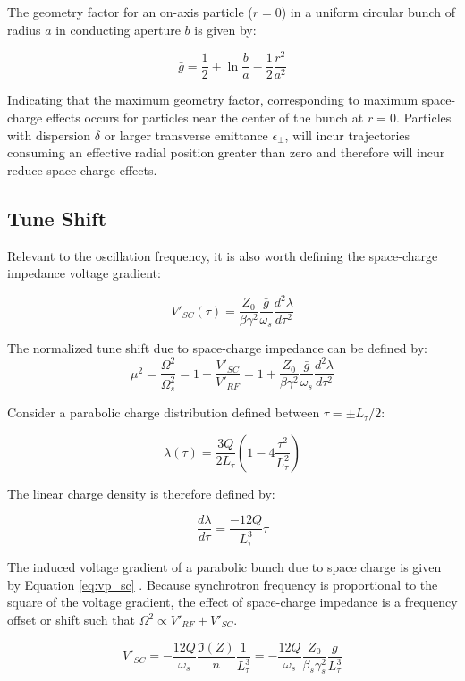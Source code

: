 The geometry factor for an on-axis particle ($r=0$) in a uniform circular bunch of radius $a$ in conducting aperture $b$ is given by:

$$\bar{g} = \frac{1}{2} + \ln\frac{b}{a} - \frac{1}2{}\frac{r^2}{a^2}$$

Indicating that the maximum geometry factor, corresponding to maximum space-charge effects occurs for particles near the center of the bunch at $r=0$. Particles with dispersion $\delta$ or larger transverse emittance $\epsilon_\perp$, will incur trajectories consuming an effective radial position greater than zero and therefore will incur reduce space-charge effects.

\subsection{Tune Shift}
Relevant to the oscillation frequency, it is also worth defining the space-charge impedance voltage gradient:

\begin{equation}
    V'_{SC}(\tau) = \frac{Z_0}{\beta\gamma^2}\frac{\bar{g}}{\omega_s}\frac{d^2\lambda}{d\tau^2}
\end{equation}

The normalized tune shift due to space-charge impedance can be defined by:
\begin{equation}
    \mu^2 = \frac{\Omega^2}{\Omega_s^2} = 1 + \frac{V'_{SC}}{V'_{RF}} = 1 + \frac{Z_0}{\beta\gamma^2}\frac{\bar{g}}{\omega_s}\frac{d^2\lambda}{d\tau^2}
    \label{eq:tune_shift}
\end{equation}

Consider a parabolic charge distribution defined between $\tau = \pm L_\tau/2$:

$$\lambda(\tau)=\frac{3Q}{2L_\tau}\left(1-4\frac{\tau^2}{L_\tau^2}\right)$$

The linear charge density is therefore defined by:

$$\frac{d\lambda}{d\tau} = \frac{-12Q}{L_\tau^3}\tau$$

The induced voltage gradient of a parabolic bunch due to space charge is given by Equation \ref{eq:vp_sc} \cite{lasheen_longitudinal_2016}. Because synchrotron frequency is proportional to the square of the voltage gradient, the effect of space-charge impedance is a frequency offset or shift such that $\Omega^2 \propto V'_{RF} + V'_{SC}$.

\begin{equation}
    V'_{SC} = -\frac{12Q}{\omega_s}\frac{\Im (Z)}{n}\frac{1}{L_\tau^3}=-\frac{12Q}{\omega_s}\frac{Z_0}{\beta_s\gamma_s^2}\frac{\bar{g}}{L_\tau^3}
    \label{eq:vp_sc}
\end{equation}

